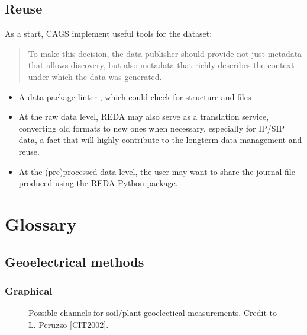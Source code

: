 \documentclass[letterpaper,10pt,english]{sphinxmanual}
\begin{document}
\section{Reuse}
\label{\detokenize{FAIR:reuse}}
\sphinxAtStartPar
As a start, CAGS implement useful tools for the dataset:
\begin{quote}

\sphinxAtStartPar
To make this decision, the data publisher should provide not just metadata that allows discovery, but also metadata that richly describes the context under which the data was generated.
\end{quote}
\begin{itemize}
\item {} 
\sphinxAtStartPar
A data package linter , which could check for structure and files

\item {} 
\sphinxAtStartPar
At the raw data level, REDA may also serve as a translation service, converting old formats to new ones when necessary, especially for IP/SIP data, a fact that will highly contribute to the long\sphinxhyphen{}term data management and reuse.

\item {} 
\sphinxAtStartPar
At the (pre)\sphinxhyphen{}processed data level, the user may want to share the journal file produced using the REDA Python package.

\end{itemize}


\chapter{Glossary}
\label{\detokenize{glossary:glossary}}\label{\detokenize{glossary::doc}}

\section{Geoelectrical methods}
\label{\detokenize{glossary:geoelectrical-methods}}

\subsection{Graphical}
\label{\detokenize{glossary:graphical}}
\begin{figure}[htbp]
\centering
\capstart

\noindent{}
\caption{Possible channels for soil/plant geoelectical measurements. Credit to L. Peruzzo {[}CIT2002{]}.}\label{\detokenize{glossary:id7}}\label{\detokenize{glossary:importing}}\end{figure}
\end{document}
